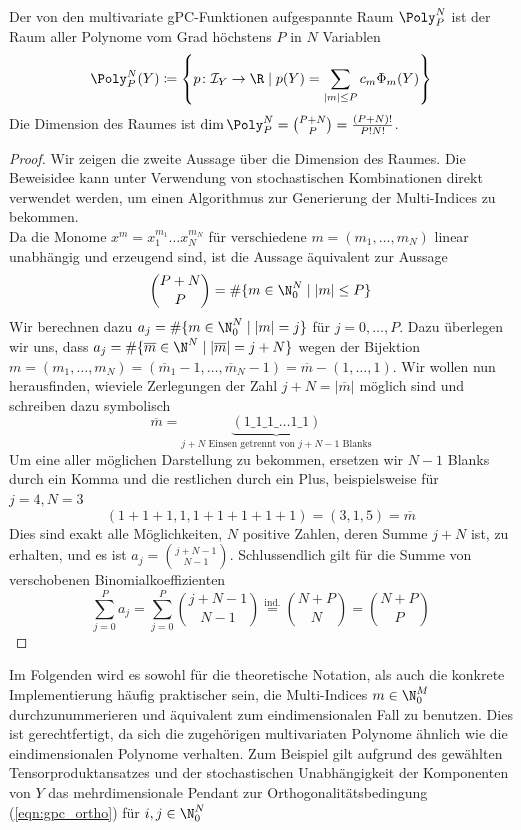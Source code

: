 \begin{mathbem}
Der von den multivariate gPC-Funktionen aufgespannte Raum $\Poly_P^N$ ist der Raum aller Polynome vom Grad höchstens $P$ in $N$ Variablen
\[\Poly_P^N(Y)\coloneqq \left\lbrace p\colon \mathcal{I}_Y\to \R \mid p(Y)=\sum_{|m|\le P}c_m\Phi_m(Y)\right\rbrace\]
Die Dimension des Raumes ist $\dim\Poly_P^N=\binom{P+N}{P}=\frac{(P+N)!}{P!N!}$.
\end{mathbem}
\begin{proof}
Wir zeigen die zweite Aussage über die Dimension des Raumes. Die Beweisidee kann unter Verwendung von stochastischen Kombinationen direkt verwendet werden, um einen Algorithmus zur Generierung der Multi-Indices zu bekommen.\\
Da die Monome $x^m=x_1^{m_1}\dots x_N^{m_N}$ für verschiedene $m=(m_1,\dots,m_N)$ linear unabhängig und erzeugend sind, ist die Aussage äquivalent zur Aussage
\[\binom{P+N}{P}=\#\lbrace m\in\N_0^N \mid |m|\le P\rbrace\] 
Wir berechnen dazu $a_j=\#\lbrace m\in\N_0^N \mid |m|=j\rbrace$ für $j=0,\dots,P$. Dazu überlegen wir uns, dass $a_j=\#\lbrace \overline{m}\in\N^N \mid |\overline{m}|=j+N\rbrace$ wegen der Bijektion $m=(m_1,\dots,m_N)=(\overline{m}_1-1,\dots,\overline{m}_N-1)=\overline{m}-(1,\dots,1)$. Wir wollen nun herausfinden, wieviele Zerlegungen der Zahl $j+N=|\overline{m}|$ möglich sind und schreiben dazu symbolisch
\[\overline{m}=\underbrace{(1\_1\_1\_\dots 1\_1)}_{j+N\text{ Einsen getrennt von } j+N-1 \text{ Blanks}}\]
Um eine aller möglichen Darstellung zu bekommen, ersetzen wir $N-1$ Blanks durch ein Komma und die restlichen durch ein Plus, beispielsweise für $j=4,N=3$
\[(1+1+1,1,1+1+1+1+1)=(3,1,5)=\overline{m}\]
Dies sind exakt alle Möglichkeiten, $N$ positive Zahlen, deren Summe $j+N$ ist, zu erhalten, und es ist $a_j=\binom{j+N-1}{N-1}$.
Schlussendlich gilt für die Summe von verschobenen Binomialkoeffizienten 
\[\sum_{j=0}^Pa_j=\sum_{j=0}^P\binom{j+N-1}{N-1}\stackrel{\text{ind.}}{=}\binom{N+P}{N}=\binom{N+P}{P}\]
\end{proof}
Im Folgenden wird es sowohl für die theoretische Notation, als auch die konkrete Implementierung häufig praktischer sein, die Multi-Indices $m\in\N_0^M$ durchzunummerieren und äquivalent zum eindimensionalen Fall zu benutzen. Dies ist gerechtfertigt, da sich die zugehörigen multivariaten Polynome ähnlich wie die eindimensionalen Polynome verhalten. Zum Beispiel gilt aufgrund des gewählten Tensorproduktansatzes und der stochastischen Unabhängigkeit der Komponenten von $Y$ das mehrdimensionale Pendant zur Orthogonalitätsbedingung (\ref{eqn:gpc_ortho}) für $i,j\in\N_0^N$
